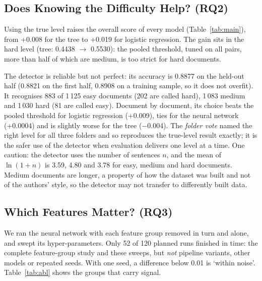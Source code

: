 \documentclass[runningheads]{llncs}
\begin{document}
\subsection{Does Knowing the Difficulty Help? (RQ2)}

Using the true level raises the overall score of every model (Table~\ref{tab:main}), from +0.008 for the tree to +0.019 for logistic regression. The gain sits in the hard level (tree: 0.4438 $\to$ 0.5530): the pooled threshold, tuned on all pairs, more than half of which are medium, is too strict for hard documents.

The detector is reliable but not perfect: its accuracy is 0.8877 on the held-out half (0.8821 on the first half, 0.8908 on a training sample, so it does not overfit). It recognises 883 of 1\,125 easy documents (202 are called hard), 1\,083 medium and 1\,030 hard (81 are called easy). Document by document, its choice beats the pooled threshold for logistic regression (+0.009), ties for the neural network (+0.0004) and is slightly worse for the tree ($-$0.004). The \emph{folder vote} named the right level for all three folders and so reproduces the true-level result exactly; it is the safer use of the detector when evaluation delivers one level at a time. One caution: the detector uses the number of sentences $n$, and the mean of $\ln(1+n)$ is 3.59, 4.80 and 3.78 for easy, medium and hard documents. Medium documents are longer, a property of how the dataset was built and not of the authors' style, so the detector may not transfer to differently built data.

\subsection{Which Features Matter? (RQ3)}
\label{sec:ablation}

We ran the neural network with each feature group removed in turn and alone, and swept its hyper-parameters. Only 52 of 120 planned runs finished in time: the complete feature-group study and these sweeps, but \emph{not} pipeline variants, other models or repeated seeds. With one seed, a difference below 0.01 is `within noise'. Table~\ref{tab:abl} shows the groups that carry signal.
\end{document}
